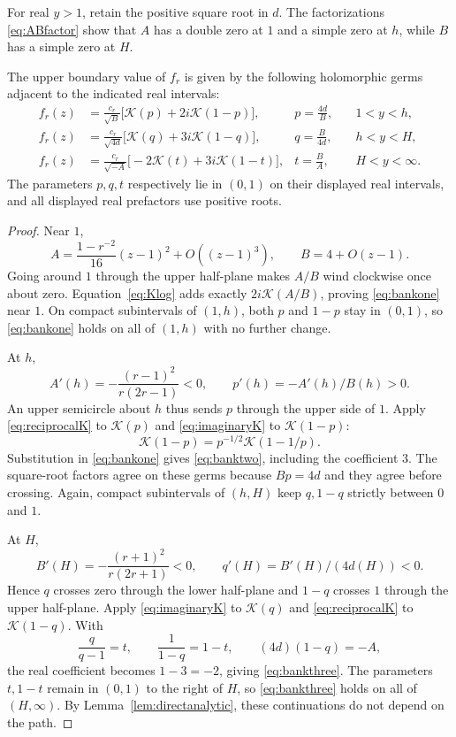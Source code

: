 For real $y>1$, retain the positive square root in $d$.
The factorizations \eqref{eq:ABfactor} show that $A$ has a double zero
at $1$ and a simple zero at $h$, while
$B$ has a simple zero at $H$.
\begin{lemma}\label{lem:upperbank}
The upper boundary value of $f_r$ is given by the following holomorphic
germs adjacent to the indicated real intervals:
\begin{align}
 f_r(z)&=\frac{c_r}{\sqrt B}
   \bigl[\mathcal K(p)+2i\mathcal K(1-p)\bigr],
 &p=\frac{4d}{B},\quad&1<y<h,\label{eq:bankone}\\
 f_r(z)&=\frac{c_r}{\sqrt{4d}}
   \bigl[\mathcal K(q)+3i\mathcal K(1-q)\bigr],
 &q=\frac{B}{4d},\quad&h<y<H,\label{eq:banktwo}\\
 f_r(z)&=\frac{c_r}{\sqrt{-A}}
   \bigl[-2\mathcal K(t)+3i\mathcal K(1-t)\bigr],
 &t=\frac BA,\quad&H<y<\infty.\label{eq:bankthree}
\end{align}
The parameters $p,q,t$ respectively lie in $(0,1)$ on their displayed
real intervals, and all displayed real prefactors use positive roots.
\end{lemma}
\begin{proof}
Near $1$,
\[
 A=\frac{1-r^{-2}}{16}(z-1)^2+O((z-1)^3),\qquad B=4+O(z-1).
\]
Going around $1$ through the upper half-plane makes $A/B$ wind clockwise
once about zero. Equation~\eqref{eq:Klog} adds exactly
$2i\mathcal K(A/B)$, proving \eqref{eq:bankone} near $1$.
On compact subintervals of $(1,h)$, both $p$ and $1-p$ stay in $(0,1)$,
so \eqref{eq:bankone} holds on all of $(1,h)$ with no further change.

At $h$,
\[
 A'(h)=-\frac{(r-1)^2}{r(2r-1)}<0,\qquad
 p'(h)=-A'(h)/B(h)>0 .
\]
An upper semicircle about $h$ thus sends $p$ through the upper side of $1$.
Apply \eqref{eq:reciprocalK} to $\mathcal K(p)$ and
\eqref{eq:imaginaryK} to $\mathcal K(1-p)$:
\[
 \mathcal K(1-p)=p^{-1/2}\mathcal K(1-1/p).
\]
Substitution in \eqref{eq:bankone} gives \eqref{eq:banktwo}, including
the coefficient $3$. The square-root factors agree on these germs because
$Bp=4d$ and they agree before crossing. Again, compact subintervals of
$(h,H)$ keep $q,1-q$ strictly between $0$ and $1$.

At $H$,
\[
 B'(H)=-\frac{(r+1)^2}{r(2r+1)}<0,\qquad q'(H)=B'(H)/(4d(H))<0.
\]
Hence $q$ crosses zero through the lower half-plane and $1-q$ crosses $1$
through the upper half-plane. Apply \eqref{eq:imaginaryK} to $\mathcal K(q)$
and \eqref{eq:reciprocalK} to $\mathcal K(1-q)$. With
\[
 \frac{q}{q-1}=t,\qquad \frac1{1-q}=1-t,\qquad
 (4d)(1-q)=-A,
\]
the real coefficient becomes $1-3=-2$, giving \eqref{eq:bankthree}.
The parameters $t,1-t$ remain in $(0,1)$ to the right of $H$, so
\eqref{eq:bankthree} holds on all of $(H,\infty)$. By Lemma~\ref{lem:directanalytic}, these continuations do not
depend on the path.
\end{proof}


